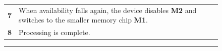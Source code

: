 \begin{figure}[t]
\begin{minipage}[t]{0.5\textwidth}
\begin{tabularx}{\columnwidth}{cX}
\textbf{7} &
When availability falls again, the device disables \textbf{M2} and
switches to the smaller memory chip \textbf{M1}.
\\

\textbf{8} &
Processing is complete.
\\

\end{tabularx}
\end{minipage}
\vspace{-0.1in}
\caption{\normalsize {}}

\label{figure-transitiongraph}
\vspace{0.10in}
\hrule
\vspace{-0.20in}
\end{figure}

